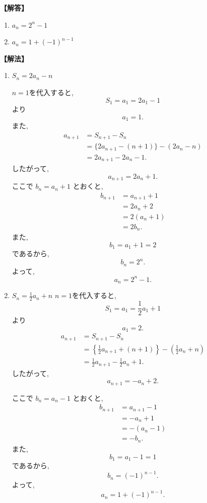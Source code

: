 \noindent\textbf{【解答】}
\begin{enumerate}[label=(\arabic*),parsep=3pt]
  \item $\displaystyle a_n=2^n-1$
  \item $\displaystyle a_n=1+(-1)^{n-1}$
\end{enumerate}

\noindent\textbf{【解法】}
\begin{enumerate}[label=(\arabic*),parsep=3pt]
  \item $\displaystyle S_n=2a_n-n$

        $n=1$を代入すると,
        \[
          S_1=a_1=2a_1-1
        \]
        より
        \[
          a_1=1.
        \]
        また,
        \begin{align*}
          a_{n+1}
           & =S_{n+1}-S_n                 \\
           & =\{2a_{n+1}-(n+1)\}-(2a_n-n) \\
           & =2a_{n+1}-2a_n-1.
        \end{align*}
        したがって,
        \[
          a_{n+1}=2a_n+1.
        \]
        ここで $b_n=a_n+1$ とおくと,
        \begin{align*}
          b_{n+1}
           & =a_{n+1}+1 \\
           & =2a_n+2    \\
           & =2(a_n+1)  \\
           & =2b_n.
        \end{align*}
        また,
        \[
          b_1=a_1+1=2
        \]
        であるから,
        \[
          b_n=2^n.
        \]
        よって,
        \[
          a_n=2^n-1.
        \]
  \item $\displaystyle S_n=\frac12a_n+n$
        $n=1$を代入すると,
        \[
          S_1=a_1=\frac12a_1+1
        \]
        より
        \[
          a_1=2.
        \]
        \begin{align*}
          a_{n+1}
           & =S_{n+1}-S_n                         \\
           & =\left\{\frac12a_{n+1}+(n+1)\right\}
          -\left(\frac12a_n+n\right)              \\
           & =\frac12a_{n+1}-\frac12a_n+1.
        \end{align*}
        したがって,
        \[
          a_{n+1}=-a_n+2.
        \]

        ここで $b_n=a_n-1$ とおくと,
        \begin{align*}
          b_{n+1}
           & =a_{n+1}-1 \\
           & =-a_n+1    \\
           & =-(a_n-1)  \\
           & =-b_n.
        \end{align*}
        また,
        \[
          b_1=a_1-1=1
        \]
        であるから,
        \[
          b_n=(-1)^{n-1}.
        \]
        よって,
        \[
          a_n=1+(-1)^{n-1}.
        \]

\end{enumerate}

